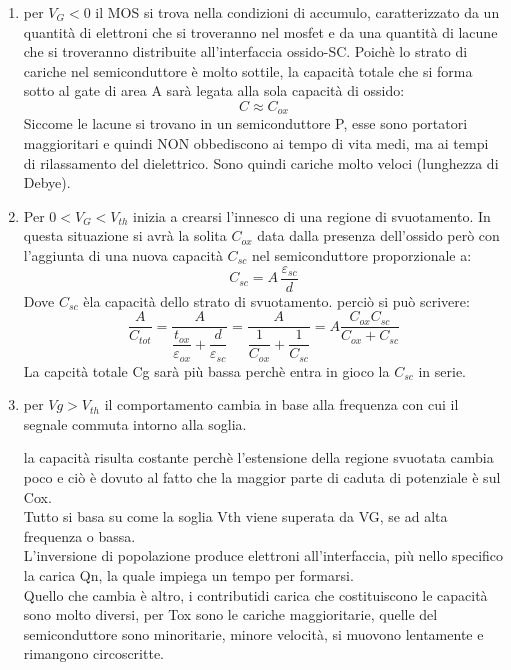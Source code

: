 \begin{enumerate}
    \item per $V_G<0$ il MOS si trova nella condizioni di accumulo, caratterizzato da un quantità di elettroni che si troveranno nel mosfet e da una quantità di lacune che si troveranno distribuite all'interfaccia ossido-SC. Poichè lo strato di cariche nel semiconduttore è molto sottile, la capacità totale che si forma sotto al gate di area A sarà legata alla sola capacità di ossido:
\begin{equation}
    C \approx C_{ox}
\end{equation}
Siccome le lacune si trovano in un semiconduttore P, esse sono portatori maggioritari e quindi NON obbediscono ai tempo di vita medi, ma ai tempi di rilassamento del dielettrico. Sono quindi cariche molto veloci (lunghezza di Debye).
%
\item Per $0<V_G<V_{th}$ inizia a crearsi l'innesco di una regione di svuotamento. In questa situazione si avrà la solita $C_{ox}$ data dalla presenza dell'ossido però con l'aggiunta di una nuova capacità $C_{sc}$ nel semiconduttore proporzionale a:
\begin{equation}
    C_{sc}=A\, \dfrac{\varepsilon_{sc}}{d}
\end{equation}
Dove $C_{sc}$ èla capacità dello strato di svuotamento.
perciò si può scrivere:
\begin{equation}
    \dfrac{A}{C_{tot}}=\dfrac{A}{\dfrac{t_{ox}}{\varepsilon_{ox}}+\dfrac{d}{\varepsilon_{sc}}}=\dfrac{A}{\dfrac{1}{C_{ox}}+\dfrac{1}{C_{sc}}}=A \dfrac{C_{ox}C_{sc}}{C_{ox}+C_{sc}}
\end{equation}
La capcità totale Cg sarà più bassa perchè entra in gioco la $C_{sc}$ in serie.\\
%
\item per $Vg>V_{th}$  il comportamento cambia in base alla frequenza con cui il segnale commuta intorno alla soglia.
\begin{exbox}[da togliere??]
    la capacità risulta costante perchè l'estensione della regione svuotata cambia poco e ciò è dovuto al fatto che la maggior parte di caduta di potenziale è sul Cox.\\
Tutto si basa su come la soglia Vth viene superata da VG, se ad alta frequenza o bassa.\\
L'inversione di popolazione produce elettroni all'interfaccia, più nello specifico la carica Qn, la quale impiega un tempo per formarsi.\\
Quello che cambia è altro, i contributidi carica che costituiscono le capacità sono molto diversi, per Tox sono le cariche maggioritarie, quelle del semiconduttore sono minoritarie, minore velocità, si muovono lentamente e rimangono circoscritte.\\
\end{exbox}
\end{enumerate}  %
